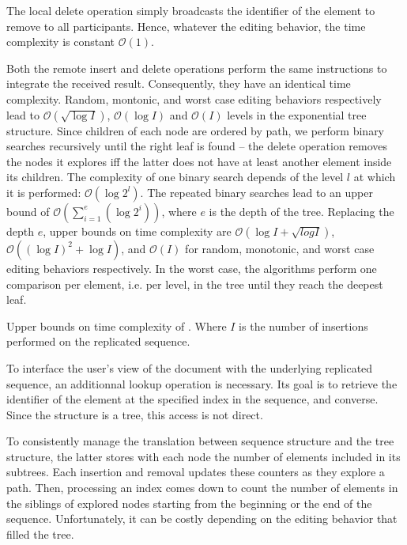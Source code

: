 The local delete operation simply broadcasts the identifier of the element to
remove to all participants. Hence, whatever the editing behavior, the time
complexity is constant $\mathcal{O}(1)$.

Both the remote insert and delete operations perform the same instructions to
integrate the received result. Consequently, they have an identical time
complexity. Random, montonic, and worst case editing behaviors respectively lead
to $\mathcal{O}(\sqrt{\log I})$, $\mathcal{O}(\log I)$ and $\mathcal{O}(I)$
levels in the exponential tree structure. Since children of each node are
ordered by path, we perform binary searches recursively until the right leaf is
found -- the delete operation removes the nodes it explores iff the latter does
not have at least another element inside its children. The complexity of one
binary search depends of the level $l$ at which it is performed:
$\mathcal{O}(\log 2^l)$. The repeated binary searches lead to an upper bound of
$\mathcal{O}(\textstyle\sum\nolimits_{i=1}^{e}(\log 2^i))$, where $e$ is the
depth of the tree. Replacing the depth $e$, upper bounds on time complexity are
$\mathcal{O}(\log I + \sqrt{log I})$, $\mathcal{O}((\log I)^2+\log I)$, and
$\mathcal{O}(I)$ for random, monotonic, and worst case editing behaviors
respectively. In the worst case, the algorithms perform one comparison per
element, i.e. per level, in the tree until they reach the deepest leaf.


\begin{table}
  \caption{\label{table:lseqtime}
    Upper bounds on time complexity of \LSEQ. Where $I$ is the number of 
    insertions performed on the replicated sequence.}
  \centering
  
\end{table}

To interface the user's view of the document with the underlying replicated
sequence, an additionnal lookup operation is necessary. Its goal is to retrieve
the identifier of the element at the specified index in the sequence, and
converse. Since the structure is a tree, this access is not direct.

To consistently manage the translation between sequence structure and the tree
structure, the latter stores with each node the number of elements included in
its subtrees. Each insertion and removal updates these counters as they explore
a path. Then, processing an index comes down to count the number of elements in
the siblings of explored nodes starting from the beginning or the end of the
sequence. Unfortunately, it can be costly depending on the editing behavior that
filled the tree.

